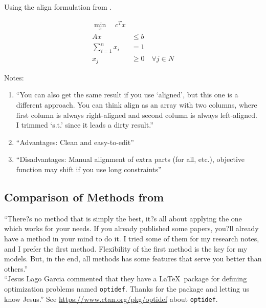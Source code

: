 \documentclass[letter,12pt]{article}
\begin{document}
Using the align formulation from \cite{Cay2013}.


\begin{align*}
\min_x \quad c^T x \\
Ax &\leq b \\
\sum_{i=1}^n x_i &= 1\\
x_j &\geq 0 \quad \forall j \in N
\end{align*}




Notes: \vspace{-0.3cm}
\begin{enumerate} \itemsep -4pt
\item ``You can also get the same result if you use `aligned', but this one is a different approach. You can think align as an array with two columns, where first column is always right-aligned and second column is always left-aligned. I trimmed `s.t.' since it leads a dirty result.''
\item ``Advantages: Clean and easy-to-edit''
\item ``Disadvantages: Manual alignment of extra parts (for all, etc.), objective function may shift if you use long constraints''
\end{enumerate}


\subsection{Comparison of Methods from \cite{Cay2013}}
\label{ssec:ComparisonOfMethodsFromCay2013}



``There?s no method that is simply the best, it?s all about applying the one which works for your needs. If you already published some papers, you?ll already have a method in your mind to do it. I tried some of them for my research notes, and I prefer the first method. Flexibility of the first method is the key for my models. But, in the end, all methods has some features that serve you better than others.'' \\


``Jesus Lago Garcia commented that they have a \LaTeX\ package for defining optimization problems named {\tt optidef}. Thanks for the package and letting us know Jesus.'' See \url{https://www.ctan.org/pkg/optidef} about {\tt optidef}.








%
%
%

{\linespread{1}

%
%

}
%
\end{document}
